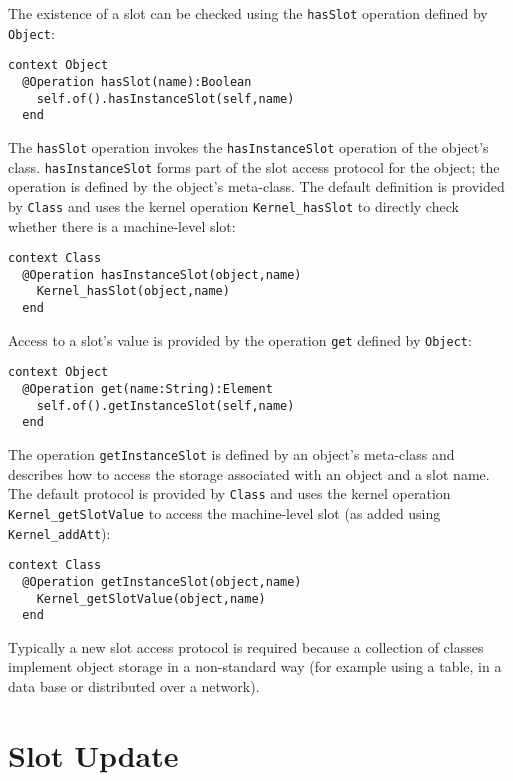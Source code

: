 \documentclass{article}
\begin{document}
The existence of a slot can be checked using the {\tt hasSlot} operation
defined by {\tt Object}:
\begin{verbatim}
context Object 
  @Operation hasSlot(name):Boolean
    self.of().hasInstanceSlot(self,name)
  end
\end{verbatim}
The {\tt hasSlot} operation invokes the {\tt hasInstanceSlot} operation of the object's class.
{\tt hasInstanceSlot} forms part of the slot access protocol for the object; the operation
is defined by the object's meta-class. The default definition is provided by {\tt Class} and uses
the kernel operation {\tt Kernel\_hasSlot} to directly check whether there is a machine-level
slot:
\begin{verbatim}
context Class
  @Operation hasInstanceSlot(object,name)
    Kernel_hasSlot(object,name)
  end
\end{verbatim}
Access to a slot's value is provided by the operation {\tt get} defined by {\tt Object}:
\begin{verbatim}
context Object
  @Operation get(name:String):Element
    self.of().getInstanceSlot(self,name)
  end
\end{verbatim}
The operation {\tt getInstanceSlot} is defined by an object's meta-class and describes how to access
the storage associated with an object and a slot name. The default protocol is provided by {\tt Class}
and uses the kernel operation {\tt Kernel\_getSlotValue} to access the machine-level slot (as added
using {\tt Kernel\_addAtt}):
\begin{verbatim}
context Class
  @Operation getInstanceSlot(object,name)
    Kernel_getSlotValue(object,name)
  end
\end{verbatim}
Typically a new slot access protocol is required because a collection of classes implement object
storage in a non-standard way (for example using a table, in a data base or distributed over a network).

\section{Slot Update}
\end{document}
